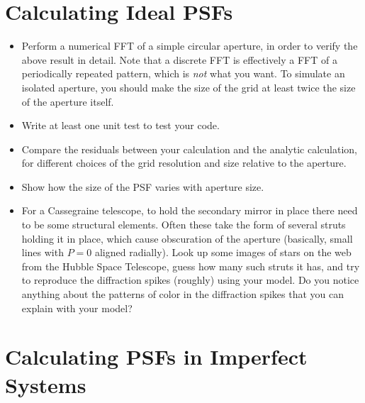 \documentclass[11pt, preprint]{aastex}
\begin{document}
\section{Calculating Ideal PSFs}

\begin{itemize}
\item Perform a numerical FFT of a simple circular aperture, in order
  to verify the above result in detail. Note that a discrete FFT is
  effectively a FFT of a periodically repeated pattern, which is {\it
    not} what you want. To simulate an isolated aperture, you should
  make the size of the grid at least twice the size of the aperture
  itself.
\item Write at least one unit test to test your code.
\item Compare the residuals between your calculation and the analytic
  calculation, for different choices of the grid resolution and size
  relative to the aperture.
\item Show how the size of the PSF varies with aperture size.
\item For a Cassegraine telescope, to hold the secondary mirror in
  place there need to be some structural elements.  Often these take
  the form of several struts holding it in place, which cause
  obscuration of the aperture (basically, small lines with $P=0$
  aligned radially). Look up some images of stars on the web from the
  Hubble Space Telescope, guess how many such struts it has, and try
  to reproduce the diffraction spikes (roughly) using your model. Do
  you notice anything about the patterns of color in the diffraction
  spikes that you can explain with your model?
\end{itemize}

\section{Calculating PSFs in Imperfect Systems}
\end{document}
